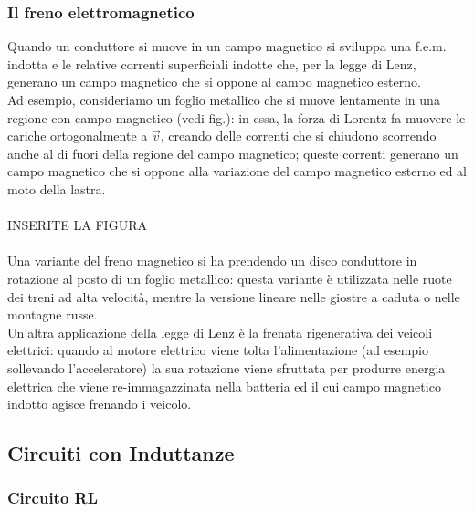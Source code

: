 \documentclass[]{article}
\begin{document}
\subsubsection{Il freno elettromagnetico}

Quando un conduttore si muove in un campo magnetico si sviluppa una f.e.m. indotta e le relative correnti superficiali indotte che, per la legge di Lenz, generano un campo magnetico che si oppone al campo magnetico esterno. \\ 
%
Ad esempio, consideriamo un foglio metallico che si muove lentamente in una regione con campo magnetico (vedi fig.): in essa, la forza di Lorentz fa muovere le cariche ortogonalmente a $ \vec{v} $, creando delle correnti che si chiudono scorrendo anche al di fuori della regione del campo magnetico; queste correnti generano un campo magnetico che si oppone alla variazione del campo magnetico esterno ed al moto della lastra. \\ 
%
%
%
\hbox{}\\ INSERITE LA FIGURA\\ \hbox{}\\ 
%
%
%
Una variante del freno magnetico si ha prendendo un disco conduttore in rotazione al posto di un foglio metallico: questa variante è utilizzata nelle ruote dei treni ad alta velocità, mentre la versione lineare nelle giostre a caduta o nelle montagne russe. \\ 
%
Un'altra applicazione della legge di Lenz è la frenata rigenerativa dei veicoli elettrici: quando al motore elettrico viene tolta l'alimentazione (ad esempio sollevando l'acceleratore) la sua rotazione viene sfruttata per produrre energia elettrica che viene re-immagazzinata nella batteria ed il cui campo magnetico indotto agisce frenando i veicolo.

\subsection{Circuiti con Induttanze}

\subsubsection{Circuito RL}
\end{document}
